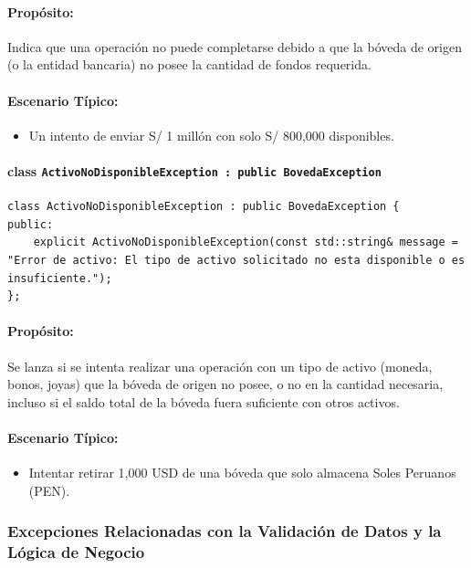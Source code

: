 \documentclass{article}
\newcommand{\inlinecode}[1]{\texttt{#1}}
\begin{document}
\paragraph*{Propósito:} Indica que una operaci\'on no puede completarse debido a que la b\'oveda de origen (o la entidad bancaria) no posee la cantidad de fondos requerida.

\paragraph*{Escenario Típico:}
\begin{itemize}
    \item Un intento de enviar S/ 1 mill\'on con solo S/ 800,000 disponibles.
\end{itemize}

\paragraph*{\textbf{class \inlinecode{ActivoNoDisponibleException : public BovedaException}}}
\vspace{2mm} %
\begin{lstlisting}
class ActivoNoDisponibleException : public BovedaException {
public:
    explicit ActivoNoDisponibleException(const std::string& message = "Error de activo: El tipo de activo solicitado no esta disponible o es insuficiente.");
};
\end{lstlisting}
\paragraph*{Propósito:} Se lanza si se intenta realizar una operaci\'on con un tipo de activo (moneda, bonos, joyas) que la b\'oveda de origen no posee, o no en la cantidad necesaria, incluso si el saldo total de la b\'oveda fuera suficiente con otros activos.

\paragraph*{Escenario Típico:}
\begin{itemize}
    \item Intentar retirar 1,000 USD de una b\'oveda que solo almacena Soles Peruanos (PEN).
\end{itemize}

\subsubsection*{Excepciones Relacionadas con la Validación de Datos y la Lógica de Negocio}
\end{document}
